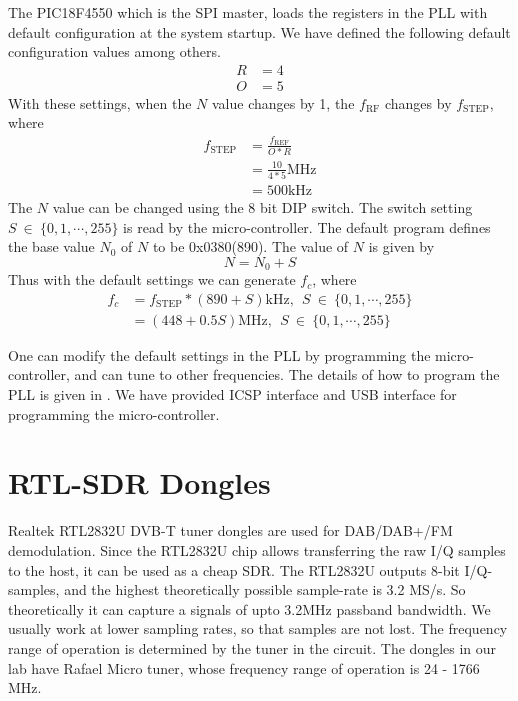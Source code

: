 \documentclass[a4paper,10pt]{article}
\begin{document}
The PIC18F4550 which is the SPI master, loads the registers in the PLL with default configuration at the system startup.
We have defined the following default configuration values among others.
\begin{align*}
 R &= 4 \\
 O &= 5
\end{align*}
With these settings, when the $N$ value changes by 1, the $f_{\text{RF}}$ changes by $f_{\text{STEP}}$, where
\begin{align}
 f_{\text{STEP}} &= \frac{f_{\text{REF}}}{O*R} \\
		  &= \frac{10}{4*5}\text{MHz} \nonumber \\
                 &= 500\text{kHz} \nonumber
\end{align}
The $N$ value can be changed using the 8 bit DIP switch.
The switch setting $S~ \in ~\lbrace 0, 1, \cdots, 255 \rbrace$ is read by the micro-controller.
The default program defines the base value $N_0$ of $N$ to be 0x0380(890).
The value of $N$ is given by
\begin{equation}
 N = N_0 + S
\end{equation}
Thus with the default settings we can generate $f_c$, where
\begin{align}
 f_c &= f_{\text{STEP}}*(890 + S)\text{kHz},~~S~ \in ~\lbrace 0, 1, \cdots, 255 \rbrace \nonumber \\
     &= (448 + 0.5S)\text{MHz},~~S~ \in ~\lbrace 0, 1, \cdots, 255 \rbrace
\end{align}

One can modify the default settings in the PLL by programming the micro-controller, and can tune to other frequencies.
The details of how to program the PLL is given in \cite{bib:pllchip}. We have provided ICSP interface and USB interface
for programming the micro-controller.

\section{RTL-SDR Dongles\cite{bib:rtlsdr}}
Realtek RTL2832U DVB-T tuner dongles are used for DAB/DAB+/FM demodulation.
Since the RTL2832U chip allows transferring the raw I/Q samples to the host, it can be used as a cheap SDR.
The RTL2832U outputs 8-bit I/Q-samples, and the highest theoretically possible sample-rate is 3.2 MS/s.
So theoretically it can capture a signals of upto 3.2MHz passband bandwidth.
We usually work at lower sampling rates, so that samples are not lost.
The frequency range of operation is determined by the tuner in the circuit.
The dongles in our lab have Rafael Micro tuner, whose frequency range of operation is 24 - 1766 MHz.
\end{document}
